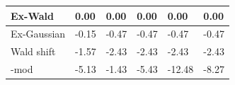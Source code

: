 \begin{tabular}{|l|l|l|l|l|l|}
\hline
Ex-Wald&0.00&0.00&0.00&0.00&0.00\\\hline
Ex-Gaussian&-0.15&-0.47&-0.47&-0.47&-0.47\\\hline
Wald shift&-1.57&-2.43&-2.43&-2.43&-2.43\\\hline
\rocdd{}-mod&-5.13&-1.43&-5.43&-12.48&-8.27\\\hline
\end{tabular}
